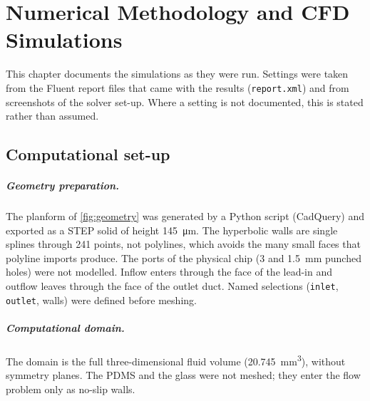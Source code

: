\chapter{Numerical Methodology and CFD Simulations}
\label{ch:numerics}

This chapter documents the simulations as they were run. Settings were taken from the Fluent report files that came with the results (\texttt{report.xml}) and from screenshots of the solver set-up. Where a setting is not documented, this is stated rather than assumed.

\section{Computational set-up}

\paragraph{Geometry preparation.} The planform of \cref{fig:geometry} was generated by a Python script (CadQuery) and exported as a STEP solid of height \SI{145}{\micro\metre}. The hyperbolic walls are single splines through 241 points, not polylines, which avoids the many small faces that polyline imports produce. The ports of the physical chip (3 and \SI{1.5}{mm} punched holes) were not modelled. Inflow enters through the face of the lead-in and outflow leaves through the face of the outlet duct. Named selections (\texttt{inlet}, \texttt{outlet}, walls) were defined before meshing.

\paragraph{Computational domain.} The domain is the full three-dimensional fluid volume (\SI{20.745}{\milli\metre\cubed}), without symmetry planes. The PDMS and the glass were not meshed; they enter the flow problem only as no-slip walls.

